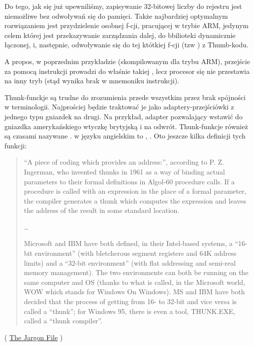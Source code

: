 Do tego, jak się już upewniliśmy, zapisywanie 32-bitowej liczby do rejestru jest niemożliwe bez odwoływań się do pamięci.
Także najbardziej optymalnym rozwiązaniem jest przydzielenie osobnej f-cji, pracującej w trybie ARM, 
jedynym celem której jest przekazywanie zarządzania dalej, do bbilioteki dynamicznie łączonej, i, następnie, odwoływanie się do tej któtkiej f-cji (tzw ) z Thumb-kodu.

A propos, w poprzednim przykładzie (skompilowanym dla trybu ARM), przejście za pomocą instrukcji  prowadzi 
do właśnie takiej , lecz procesor się nie przestawia na inny tryb (stąd wynika brak  w mnemoniku instrukcji).


Thunk-funckje są trudne do zrozumienia przede wszystkim przez brak spójności w terminologii.
Najprościej będzie traktować je jako adaptery-przejściówki z jednego typu gniazdek na drugi.
Na przykład, adapter pozwalający wstawić do gniazdka amerykańskiego wtyczkę brytyjską i na odwrót. Thunk-funkcje również są czasami nazywane .  w języku angielskim to , .
Oto jeszcze kilka definicji tych funkcji:

\begin{framed}
\begin{quotation}
“A piece of coding which provides an address:”, according to P. Z. Ingerman, 
who invented thunks in 1961 as a way of binding actual parameters to their formal 
definitions in Algol-60 procedure calls. If a procedure is called with an expression 
in the place of a formal parameter, the compiler generates a thunk which computes 
the expression and leaves the address of the result in some standard location.

\dots

Microsoft and IBM have both defined, in their Intel-based systems, a “16-bit environment” 
(with bletcherous segment registers and 64K address limits) and a “32-bit environment” 
(with flat addressing and semi-real memory management). The two environments can both be 
running on the same computer and OS (thanks to what is called, in the Microsoft world, 
WOW which stands for Windows On Windows). MS and IBM have both decided that the process 
of getting from 16- to 32-bit and vice versa is called a “thunk”; for Windows 95, 
there is even a tool, THUNK.EXE, called a “thunk compiler”.
\end{quotation}
\end{framed}
( \href{http://go.yurichev.com/17362}{The Jargon File} )

